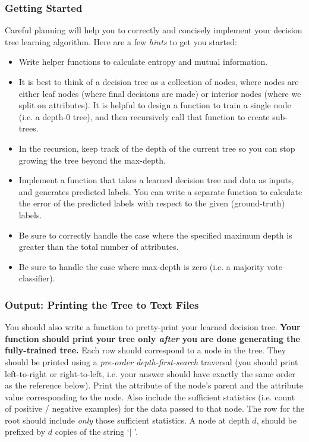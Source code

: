 \subsubsection{Getting Started}
\label{sec:getting started}

Careful planning will help you to correctly and concisely implement your decision tree learning algorithm. Here are a few \emph{hints} to get you started:
\begin{itemize}
    \item Write helper functions to calculate entropy and mutual information.
    \item It is best to think of a decision tree as a collection of nodes, where nodes are either leaf nodes (where final decisions are made) or interior nodes (where we split on attributes). It is helpful to design a function to train a single node (i.e. a depth-0 tree), and then recursively call that function to create sub-trees.
    \item In the recursion, keep track of the depth of the current tree so you can stop growing the tree beyond the max-depth.
    \item Implement a function that takes a learned decision tree and data as inputs, and generates predicted labels. You can write a separate function to calculate the error of the predicted labels with respect to the given (ground-truth) labels.
    \item Be sure to correctly handle the case where the specified maximum depth is greater than the total number of attributes.
    \item Be sure to handle the case where max-depth is zero (i.e. a majority vote classifier). 
\end{itemize}


\clearpage

\subsubsection{Output: Printing the Tree to Text Files}
\label{sec:printtree}

You should also write a function to pretty-print your learned decision tree. \textbf{Your function should print your tree only \emph{after} you are done generating the fully-trained tree.} Each row should correspond to a node in the tree. They should be printed using a \emph{pre-order depth-first-search} traversal (you should print left-to-right or right-to-left, i.e. your answer should have exactly the same order as the reference below). Print the attribute of the node's parent and the attribute value corresponding to the node. Also include the sufficient statistics (i.e. count of positive / negative examples) for the data passed to that node. The row for the root should include \emph{only} those sufficient statistics. A node at depth $d$, should be prefixed by $d$ copies of the string `$\mid$ '.

